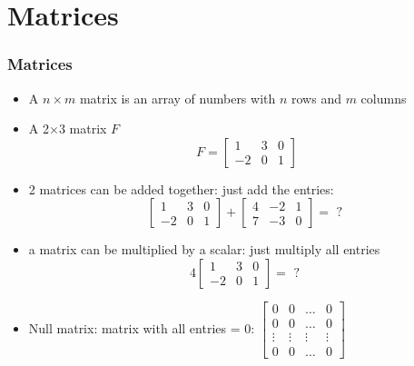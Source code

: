 \documentclass[8pt]{beamer}
\newcommand{\myemph}[1]{{\color{blue}{#1}}}
\begin{document}
\section{Matrices}


\begin{frame}
  \frametitle{Matrices}
  \begin{itemize}
  \item A $n\times m$ matrix is an array of numbers with $n$ rows and $m$ columns
  \item A 2$\times 3$ matrix $F$
    $$
    F =
    \begin{bmatrix}
      1 & 3 & 0\\
      -2 & 0 & 1
    \end{bmatrix}
    $$
  \item 2 matrices \myemph{of the same size} can be added together: just add the entries:
    $$    
    \begin{bmatrix}
      1 & 3 & 0\\
      -2 & 0 & 1
    \end{bmatrix}+
    \begin{bmatrix}
      4 & -2 & 1\\
      7 & -3 & 0
    \end{bmatrix}
    =
    \text{ ? }
    $$\item a matrix can be multiplied by a scalar: just multiply all entries
    $$ 4   
    \begin{bmatrix}
      1 & 3 & 0\\
      -2 & 0 & 1
    \end{bmatrix}=
    \text{ ? }
    $$
  \item Null matrix: matrix with all  entries = 0: $
    \begin{bmatrix}
      0 & 0 &\hdots & 0\\
      0 & 0 &\hdots & 0\\
      \vdots & \vdots & \vdots & \vdots\\
      0 & 0 &\hdots & 0
    \end{bmatrix}
    $
  \end{itemize}
\end{frame}
\end{document}
